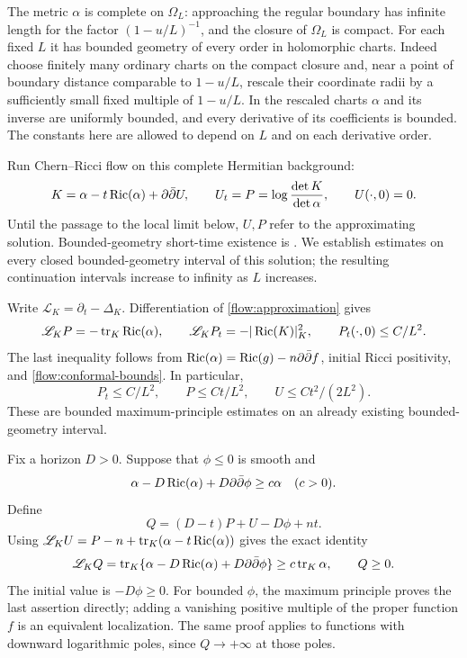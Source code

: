 The metric $\alpha$ is complete on $\Omega_L$: approaching the regular
boundary has infinite length for the factor $(1-u/L)^{-1}$, and the
closure of $\Omega_L$ is compact.  For each fixed $L$ it has bounded
geometry of every order in holomorphic charts.  Indeed choose finitely
many ordinary charts on the compact closure and, near a point of
boundary distance comparable to $1-u/L$, rescale their coordinate
radii by a sufficiently small fixed multiple of $1-u/L$.  In the
rescaled charts $\alpha$ and its inverse are uniformly bounded, and
every derivative of its coefficients is bounded.  The constants here
are allowed to depend on $L$ and on each derivative order.

Run Chern--Ricci flow on this complete Hermitian background:
\begin{equation}\label{flow:approximation}
 K=\alpha-t\operatorname{Ric}(\alpha)+\partial\bar\partial U,\qquad
 U_t=P=\log\frac{\det K}{\det\alpha},\qquad U(\cdot,0)=0.
\end{equation}
Until the passage to the local limit below, $U,P$ refer to the
approximating solution.
Bounded-geometry short-time existence is
\cite[Definition~2.1 and Lemma~2.1]{LeeTam}.  We establish estimates
on every closed bounded-geometry interval of this solution; the
resulting continuation intervals increase to infinity as $L$ increases.

Write $\mathscr L_K=\partial_t-\Delta_K$.
Differentiation of \eqref{flow:approximation} gives
\begin{equation}\label{flow:scalar-evolutions}
 \mathscr L_KP=-\operatorname{tr}_K\operatorname{Ric}(\alpha),\qquad
 \mathscr L_KP_t=-|\operatorname{Ric}(K)|_K^2,
 \qquad P_t(\cdot,0)\le C/L^2.
\end{equation}
The last inequality follows from
$\operatorname{Ric}(\alpha)=\operatorname{Ric}(g)-n\partial\bar\partial f$, initial Ricci positivity, and
\eqref{flow:conformal-bounds}.  In particular,
\begin{equation}\label{flow:upper-potentials}
 P_t\le C/L^2,
 \qquad P\le Ct/L^2,
 \qquad U\le Ct^2/(2L^2).
\end{equation}
These are bounded maximum-principle estimates on an already existing
bounded-geometry interval.

Fix a horizon $D>0$.  Suppose that $\phi\le0$ is smooth and
\begin{equation}\label{flow:phi-condition}
 \alpha-D\operatorname{Ric}(\alpha)+D\partial\bar\partial\phi\ge c\alpha
 \quad(c>0).
\end{equation}
Define
\begin{equation}\label{flow:Q-definition}
 Q=(D-t)P+U-D\phi+nt.
\end{equation}
Using
$\mathscr L_KU=P-n+\operatorname{tr}_K(\alpha-t\operatorname{Ric}(\alpha))$ gives the exact
identity
\begin{equation}\label{flow:Q-comparison}
 \mathscr L_KQ
 =\operatorname{tr}_K\{\alpha-D\operatorname{Ric}(\alpha)+D\partial\bar\partial\phi\}
 \ge c\operatorname{tr}_K\alpha,
 \qquad Q\ge0.
\end{equation}
The initial value is $-D\phi\ge0$.  For bounded $\phi$, the maximum
principle proves the last assertion directly; adding a vanishing
positive multiple of the proper function $f$ is an equivalent
localization.  The same proof applies to functions with downward
logarithmic poles, since $Q\to+\infty$ at those poles.

